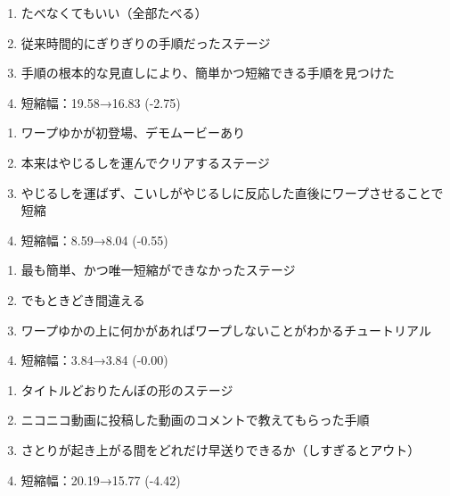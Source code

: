 \begin{enumerate}[label={\sarrow}]
\item たべなくてもいい（全部たべる）
\item 従来時間的にぎりぎりの手順だったステージ
\item 手順の根本的な見直しにより、簡単かつ短縮できる手順を見つけた
\item 短縮幅：19.58→16.83 (-2.75)
\end{enumerate}



\begin{enumerate}[label={\sarrow}]
\item ワープゆかが初登場、デモムービーあり
\item 本来はやじるしを運んでクリアするステージ
\item やじるしを運ばず、こいしがやじるしに反応した直後にワープさせることで短縮
\item 短縮幅：8.59→8.04 (-0.55)
\end{enumerate}



\begin{enumerate}[label={\sarrow}]
\item 最も簡単、かつ唯一短縮ができなかったステージ
\item でもときどき間違える
\item ワープゆかの上に何かがあればワープしないことがわかるチュートリアル
\item 短縮幅：3.84→3.84 (-0.00)
\end{enumerate}



\clearpage
\begin{enumerate}[label={\sarrow}]
\item タイトルどおりたんぼの形のステージ
\item ニコニコ動画に投稿した動画のコメントで教えてもらった手順
\item さとりが起き上がる間をどれだけ早送りできるか（しすぎるとアウト）
\item 短縮幅：20.19→15.77 (-4.42)
\end{enumerate}



